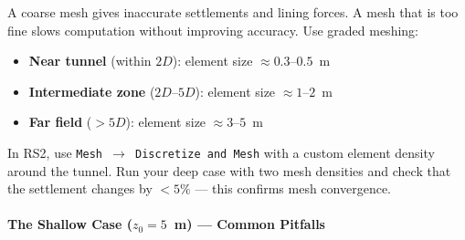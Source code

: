 \begin{warnbox}
A coarse mesh gives inaccurate settlements and lining forces. A mesh that is too fine slows computation without improving accuracy. Use graded meshing:
\begin{itemize}[nosep]
\item \textbf{Near tunnel} (within $2D$): element size $\approx 0.3$--$0.5$~m
\item \textbf{Intermediate zone} ($2D$--$5D$): element size $\approx 1$--$2$~m
\item \textbf{Far field} ($>5D$): element size $\approx 3$--$5$~m
\end{itemize}
\vspace{0.5em}

In RS2, use \texttt{Mesh $\to$ Discretize and Mesh} with a custom element density around the tunnel. Run your deep case with two mesh densities and check that the settlement changes by $< 5\%$ --- this confirms mesh convergence.
\end{warnbox}

\paragraph{The Shallow Case ($z_0 = 5$~m) --- Common Pitfalls}

